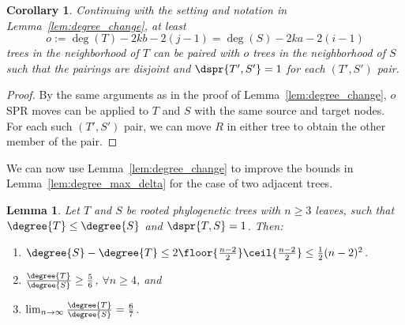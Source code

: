 \documentclass[11pt,onecolumn,conference]{IEEEtran}
\newtheorem{lemma}[theorem]{Lemma}
\newtheorem{corollary}[theorem]{Corollary}
\begin{document}
\begin{corollary}
\label{cor:paired_neighbors}
Continuing with the setting and notation in Lemma~\ref{lem:degree_change}, at least
$$o := \deg(T) - 2kb - 2(j-1) = \deg(S) - 2ka - 2(i-1)$$
trees in the neighborhood of $T$ can be paired with $o$ trees in the neighborhood of $S$ such that the pairings are disjoint and $\dspr{T',S'} = 1$ for each $(T',S')$ pair.
\end{corollary}
\begin{proof}
By the same arguments as in the proof of Lemma~\ref{lem:degree_change}, $o$ SPR moves can be applied to $T$ and $S$ with the same source and target nodes.
For each such $(T',S')$ pair, we can move $R$ in either tree to obtain the other member of the pair.
\end{proof}

We can now use Lemma~\ref{lem:degree_change} to improve the bounds in Lemma~\ref{lem:degree_max_delta} for the case of two adjacent trees.
\begin{lemma}
	\label{lem:degree_max_delta_adjacent}
	Let $T$ and $S$ be rooted phylogenetic trees with $n \ge 3$ leaves, such that $\degree{T} \le \degree{S}$ and $\dspr{T,S} = 1$.
	Then:
	\begin{enumerate}
		\item $\degree{S} - \degree{T} \le 2\floor{\frac{n-2}{2}}\ceil{\frac{n-2}{2}} \le \frac{1}{2} (n-2)^2 $.
		\item $\frac{\degree{T}}{\degree{S}} \ge \frac{5}{6}$, $\forall n \ge 4$, and
		\item $\lim_{n\rightarrow\infty}\frac{\degree{T}}{\degree{S}} =  \frac{6}{7}$.
	\end{enumerate}
\end{lemma}
\end{document}
